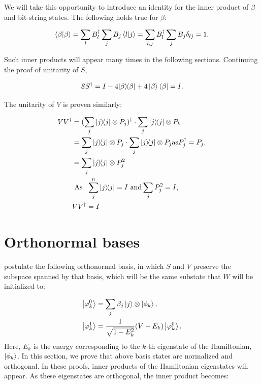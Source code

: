 We will take this opportunity to introduce an identity for the inner product of $\beta$ and bit-string states. The following holds true for $\beta$:

$$ \braket{\beta}{\beta} = \sum_l B_l^{\dagger} \sum_j B_j \braket{l}{j} =  \sum_{l,j} B_l^{\dagger} \sum_j B_j \delta_{lj} = 1. $$

Such inner products will appear many times in the following sections. Continuing the proof of unitarity of $S$,

$$S S^{\dagger} = I - 4 | \beta \rangle\!\langle \beta | + 4 \left\vert{\beta}\right\rangle \left\langle{\beta}\right\vert = I.$$

The unitarity of $V$ is proven similarly:

\begin{align} \begin{split}
VV^{\dagger} &= (\sum_{j} | j \rangle\!\langle j | \otimes P_{j})^{\dagger} \cdot \sum_{j} | j \rangle\!\langle j | \otimes P_{k} \\
&= \sum_{j} | j \rangle\!\langle j | \otimes P_{j} \cdot \sum_{j} | j \rangle\!\langle j | \otimes P_{j} \text{as}  P^{\dagger}_j = P_j.\\
&= \sum_j | j \rangle\!\langle j |  \otimes P_j^2\\
& \text{\  As  \ } \sum_{j}^{n} | j \rangle\!\langle j | = I \text{ and} \sum_j P_j^2 = I,\\
& VV^{\dagger} = I \\
\end{split} \end{align}


\section{Orthonormal bases}
\textcite{poulin} postulate the following orthonormal basis, in which $S$ and $V$ preserve the subspace spanned by that basis, which will be the same substate that $W$ will be initialized to:

\begin{align} \begin{split} \label{basis}
\left\vert{\varphi_k^0}\right\rangle &= \sum_j\beta_j\left\vert{j}\right\rangle\otimes\left\vert{\phi_k}\right\rangle, \\
\left\vert{\varphi_k^1}\right\rangle &= \frac 1{\sqrt{1-E_k^2}}(V-E_k)\left\vert{\varphi_k^0}\right\rangle.
\end{split} \end{align}
Here, $E_k$ is the energy corresponding to the $k$-th eigenstate of the Hamiltonian, $\left\vert{\phi_k}\right\rangle$. In this section, we prove that above basis states are normalized and orthogonal. In these proofs, inner products of the Hamiltonian eigenstates will appear. As these eigenstates are orthogonal, the inner product becomes:

